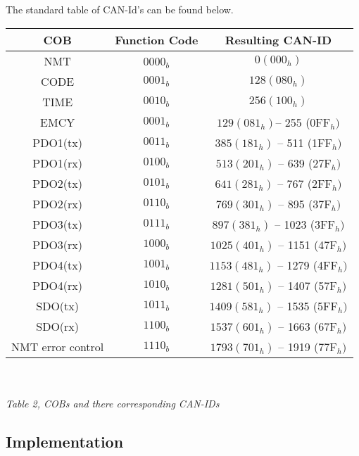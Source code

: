 


The standard table of CAN-Id's can be found below.

\begin{tabular}{|c|c|c|}
	\hline 
	\textbf{COB} & \textbf{Function Code} & \textbf{Resulting CAN-ID} \\ 
	\hline 
	NMT &  0000$_{b}$  & $0 (000_{h})$  \\ 
	\hline 
	CODE & $0001_{b}$ &  $128 (080_{h})$\\ 
	\hline 
	TIME & $0010_{b}$ &  $256 (100_{h})$\\ 
	\hline 
	EMCY & $0001_{b}$ &   $129 (081_{h}) $–  255 (0FF$_{h})$ \\ 
	\hline 
	PDO1(tx) & $0011_{b}$ &  $385 (181_{h}) $ – 511 (1FF$_{h})$\\ 
	\hline 
	PDO1(rx) & $0100_{b}$ &  $513 (201_{h}) $ –  639 (27F$_{h})$\\ 
	\hline 
	PDO2(tx) & $0101_{b}$ &  $641 (281_{h}) $ –  767 (2FF$_{h})$\\ 
	\hline 
	PDO2(rx) & $0110_{b}$ &  $769 (301_{h})$  –  895 (37F$_{h})$\\ 
	\hline 
	PDO3(tx) & $0111_{b}$ &  $897 (381_{h}) $ – 1023 (3FF$_{h})$\\ 
	\hline 
	PDO3(rx) & $1000_{b}$ &  $1025 (401_{h}) $ –  1151 (47F$_{h})$\\ 
	\hline 
	PDO4(tx) & $1001_{b}$ &  $1153 (481_{h}) $ –  1279 (4FF$_{h})$\\ 
	\hline 
	PDO4(rx) & $1010_{b}$ & $1281 (501_{h}) $ –  1407 (57F$_{h})$\\ 
	\hline 
	SDO(tx) & $1011_{b}$ & $ 1409 (581_{h}) $ –  1535 (5FF$_{h})$\\ 
	\hline 
	SDO(rx) & $1100_{b}$ & $1537 (601_{h}) $ –  1663 (67F$_{h})$\\ 
	\hline 
	NMT error control &$ 1110_{b} $& $ 1793 (701_{h}) $ –  1919 (77F$_{h})$\\ 
	\hline 
\end{tabular} 
\\
\\
\textit{Table 2, COBs and there corresponding CAN-IDs}







\subsection{Implementation}


